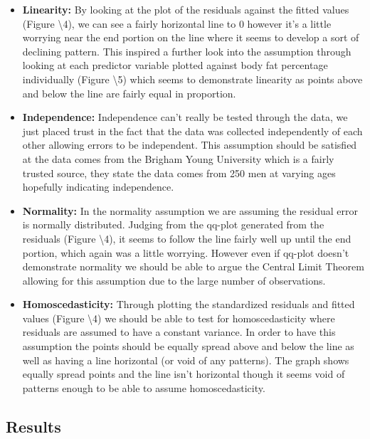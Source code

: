 \documentclass[letterpaper,9pt,twocolumn,twoside,]{pinp}
\providecommand{\tightlist}{%
  \setlength{\itemsep}{0pt}\setlength{\parskip}{0pt}}
\begin{document}
\begin{itemize}
\tightlist
\item
  \textbf{Linearity:} By looking at the plot of the residuals against
  the fitted values (Figure \textbackslash4), we can see a fairly
  horizontal line to 0 however it's a little worrying near the end
  portion on the line where it seems to develop a sort of declining
  pattern. This inspired a further look into the assumption through
  looking at each predictor variable plotted against body fat percentage
  individually (Figure \textbackslash5) which seems to demonstrate
  linearity as points above and below the line are fairly equal in
  proportion.
\item
  \textbf{Independence:} Independence can't really be tested through the
  data, we just placed trust in the fact that the data was collected
  independently of each other allowing errors to be independent. This
  assumption should be satisfied at the data comes from the Brigham
  Young University which is a fairly trusted source, they state the data
  comes from 250 men at varying ages hopefully indicating independence.
\item
  \textbf{Normality:} In the normality assumption we are assuming the
  residual error is normally distributed. Judging from the qq-plot
  generated from the residuals (Figure \textbackslash4), it seems to
  follow the line fairly well up until the end portion, which again was
  a little worrying. However even if qq-plot doesn't demonstrate
  normality we should be able to argue the Central Limit Theorem
  allowing for this assumption due to the large number of observations.
\item
  \textbf{Homoscedasticity:} Through plotting the standardized residuals
  and fitted values (Figure \textbackslash4) we should be able to test
  for homoscedasticity where residuals are assumed to have a constant
  variance. In order to have this assumption the points should be
  equally spread above and below the line as well as having a line
  horizontal (or void of any patterns). The graph shows equally spread
  points and the line isn't horizontal though it seems void of patterns
  enough to be able to assume homoscedasticity.
\end{itemize}

\hypertarget{results}{%
\subsection{Results}\label{results}}
\end{document}
